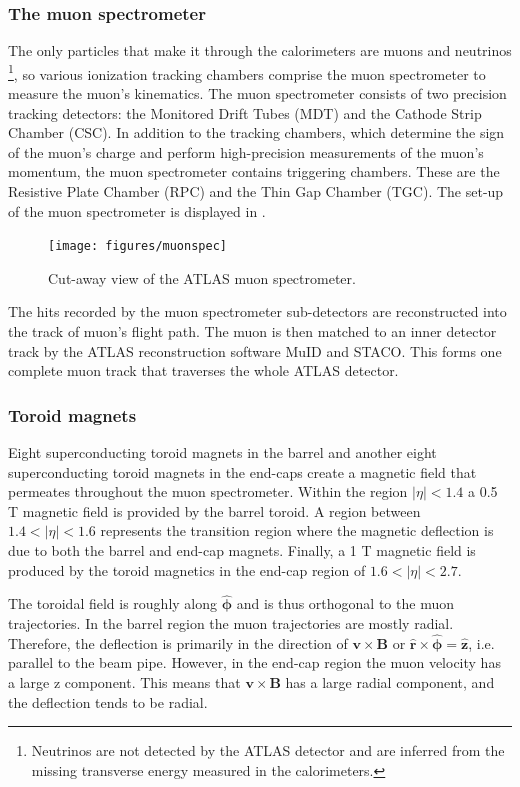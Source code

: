 \subsubsection{The muon spectrometer}
\label{subsubsec:muonspec}

The only particles that make it through the calorimeters are muons and neutrinos
\footnote{Neutrinos are not detected by the ATLAS detector and are 
inferred from the missing transverse energy measured in the calorimeters.},
so various ionization tracking chambers comprise 
the muon spectrometer to measure the muon's kinematics.
The muon spectrometer consists
of two precision tracking detectors: the Monitored Drift Tubes (MDT) and the
Cathode Strip Chamber (CSC). In addition to the tracking chambers, which
determine the sign of the muon's charge and perform 
high-precision measurements of the muon's momentum, the muon spectrometer 
contains triggering chambers. These are the Resistive Plate Chamber (RPC)
and the Thin Gap Chamber (TGC). The set-up of the muon spectrometer is displayed
in .

\begin{figure}[!hbpt]
  \centering
  \texttt{[image: figures/muonspec]}
  \caption{Cut-away view of the ATLAS muon spectrometer.}
  \label{fig:muonspec}
\end{figure}

The hits recorded by the muon spectrometer sub-detectors are reconstructed into
the track of muon's flight path. The muon is then matched to an inner detector
track by the ATLAS reconstruction software MuID and STACO. This forms one complete
muon track that traverses the whole ATLAS detector.

\subsubsection*{Toroid magnets}
Eight superconducting toroid magnets in the barrel and another eight 
superconducting toroid magnets in the end-caps create a magnetic field that
permeates throughout the muon spectrometer. Within the region $|\eta| < 1.4$
a 0.5 T magnetic field is provided by the barrel toroid.  A region between
$1.4 < |\eta| < 1.6$ represents the transition region where the magnetic deflection
is due to both the barrel and end-cap magnets. Finally, a 1 T magnetic field
is produced by the toroid magnetics in the end-cap region of $1.6 < |\eta| < 2.7$.

The toroidal field is roughly along $\mathbf{\hat \phi}$ and is thus
orthogonal to the muon trajectories. In the barrel region the muon trajectories
are mostly radial. Therefore, the deflection is primarily in the
direction of $\mathbf{v} \times \mathbf{B}$ or $\mathbf{\hat r} \times \mathbf{\hat \phi} = \mathbf{\hat z}$, i.e. parallel to the beam pipe.
However, in the end-cap region the muon velocity has a large z component. This
means that $\mathbf{v} \times \mathbf{B}$ has a large radial component, and the
deflection tends to be radial.

